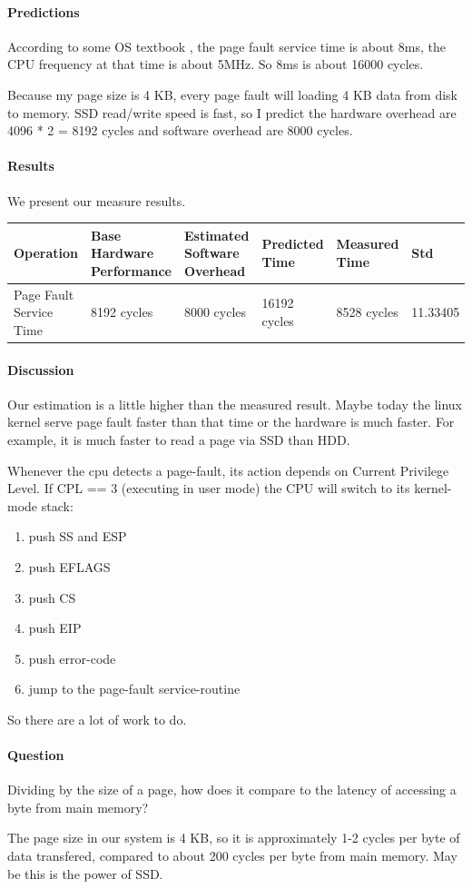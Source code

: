 \paragraph{Predictions}
According to some OS textbook \cite{page}, the page fault service time is about 8ms, the CPU frequency at that time is about 5MHz. So 8ms is about 16000 cycles.

Because my page size is 4 KB, every page fault will loading 4 KB data from disk to memory. SSD read/write speed is fast, so I predict the hardware overhead are 4096 * 2 = 8192 cycles and software overhead are 8000 cycles.

\paragraph{Results}
We present our measure results.

\begin{center}
\begin{tabular}{| p{2cm} | p{3cm} | p{3cm} | p{2.5cm} | p{2.5cm} | p{2cm} }
Operation  & Base Hardware Performance  & Estimated Software Overhead  & Predicted Time  & Measured Time  & Std \\
\hline
Page Fault Service Time & 8192 cycles& 8000 cycles& 16192 cycles& 8528 cycles & 11.33405\\

\end{tabular}
\end{center}

\paragraph{Discussion}
Our estimation is a little higher than the measured result. Maybe today  the linux kernel serve page fault faster than that time or the hardware is much faster. For example, it is much faster to read a page via SSD than HDD.

Whenever the cpu detects a page-fault, its action depends on Current Privilege Level. If  CPL == 3  (executing in user mode)
the CPU will switch to its kernel-mode stack:

\begin{enumerate}
\item push  SS  and  ESP
\item push  EFLAGS
\item push  CS
\item push  EIP
\item push  error-code
\item jump to the page-fault service-routine  
\end{enumerate}

So there are a lot of work to do. 


\paragraph{Question} Dividing by the size of a page, how does it compare to the latency of accessing a byte from main memory?

The page size in our system is 4 KB, so it is approximately 1-2 cycles per byte of data transfered, compared to about 200 cycles per byte from main memory. May be this is the power of SSD.
